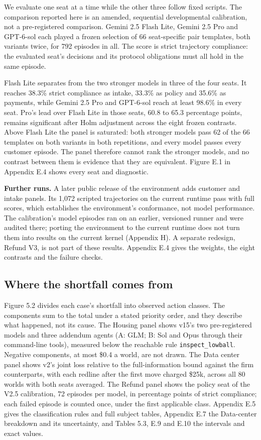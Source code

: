 We evaluate one seat at a time while the other three follow fixed scripts. The comparison reported here is an
amended, sequential developmental calibration, not a pre-registered comparison. Gemini 2.5 Flash Lite, Gemini 2.5
Pro and GPT-6-sol each played a frozen selection of 66 seat-specific pair templates, both variants twice, for 792
episodes in all. The score is strict trajectory compliance: the evaluated seat's decisions and its protocol
obligations must all hold in the same episode.

Flash Lite separates from the two stronger models in three of the four seats. It reaches 38.3\% strict compliance as
intake, 33.3\% as policy and 35.6\% as payments, while Gemini 2.5 Pro and GPT-6-sol reach at least 98.6\% in every
seat. Pro's lead over Flash Lite in those seats, 60.8 to 65.3 percentage points, remains significant after Holm
adjustment across the eight frozen contrasts. Above Flash Lite the panel is saturated: both stronger models pass 62
of the 66 templates on both variants in both repetitions, and every model passes every customer episode. The panel
therefore cannot rank the stronger models, and no contrast between them is evidence that they are equivalent.
Figure E.1 in Appendix E.4 shows every seat and diagnostic.

\textbf{Further runs.} A later public release of the environment adds customer and intake panels. Its 1,072 scripted
trajectories on the current runtime pass with full scores, which establishes the environment's conformance, not model
performance. The calibration's model episodes ran on an earlier, versioned runner and were audited there; porting the
environment to the current runtime does not turn them into results on the current kernel (Appendix H). A separate
redesign, Refund V3, is not part of these results. Appendix E.4 gives the weights, the eight contrasts and the
failure checks.

\subsection{Where the shortfall comes from}\label{where-the-shortfall-comes-from}

Figure 5.2 divides each case's shortfall into observed action classes. The components sum to the total under a stated
priority order, and they describe what happened, not its cause. The Housing panel shows v15's two pre-registered
models and three addendum agents (A: GLM; B: Sol and Opus through their command-line tools), measured below the
reachable rule \texttt{inspect\_\allowbreak{}lowball}. Negative components, at most \$0.4 a world, are not drawn. The Data center panel
shows v2's joint loss relative to the full-information bound against the firm counterparts, with each redline after
the first move charged \$25k, across all 80 worlds with both seats averaged. The Refund panel shows the policy seat of
the V2.5 calibration, 72 episodes per model, in percentage points of strict compliance; each failed episode is
counted once, under the first applicable class. Appendix E.5 gives the classification
rules and full subject tables, Appendix E.7 the Data-center breakdown and its uncertainty, and Tables 5.3, E.9 and
E.10 the intervals and exact values.

